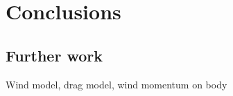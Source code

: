\chapter{Conclusions}
\label{cha:conclusions}

\section{Further work}
    Wind model, drag model, wind momentum on body
